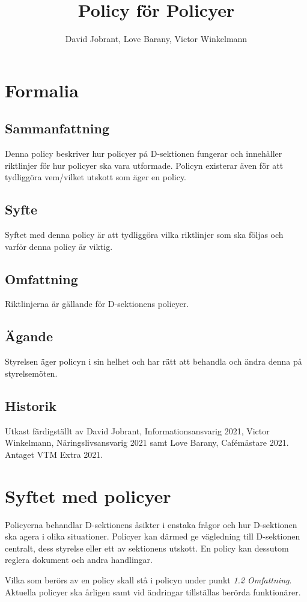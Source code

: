 \documentclass[]{dsekprotokoll}
\title{Policy för Policyer}
\author{David Jobrant, Love Barany, Victor Winkelmann}
\begin{document}
\section{Formalia}
\subsection{Sammanfattning}
Denna policy beskriver hur policyer på D-sektionen fungerar och innehåller riktlinjer för hur policyer ska vara utformade. Policyn existerar även för att tydliggöra vem/vilket utskott som äger en policy.

\subsection{Syfte}
Syftet med denna policy är att tydliggöra vilka riktlinjer som ska följas och varför denna policy är viktig.

\subsection{Omfattning}
Riktlinjerna är gällande för D-sektionens policyer.

\subsection{Ägande}
Styrelsen äger policyn i sin helhet och har rätt att behandla och ändra denna på styrelsemöten.

\subsection{Historik}
Utkast färdigställt av David Jobrant, Informationsansvarig 2021, Victor Winkelmann, Näringslivsansvarig 2021 samt Love Barany, Cafémästare 2021. \\
Antaget VTM Extra 2021.

\section{Syftet med policyer}
Policyerna behandlar D-sektionens åsikter i enstaka frågor och hur D-sektionen ska agera i olika situationer. Policyer kan därmed ge vägledning till D-sektionen centralt, dess styrelse eller ett av sektionens utskott. En policy kan dessutom reglera dokument och andra handlingar.

Vilka som berörs av en policy skall stå i policyn under punkt \textit{1.2 Omfattning}. Aktuella policyer ska årligen samt vid ändringar tillställas berörda funktionärer.
\end{document}
